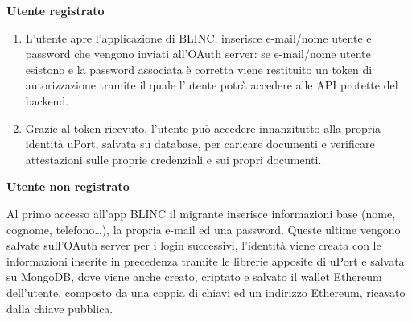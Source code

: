 \textbf{Utente registrato}

\begin{enumerate}
    \item L’utente apre l’applicazione di BLINC, inserisce e-mail/nome utente e password che vengono inviati all’OAuth server:
    se e-mail/nome utente esistono e la password associata è corretta viene restituito un token di autorizzazione tramite il quale l’utente potrà accedere alle API protette del backend.
    \item Grazie al token ricevuto, l’utente può accedere innanzitutto alla propria identità uPort, salvata su database, 
    per caricare documenti e verificare attestazioni sulle proprie credenziali e sui propri documenti.
\end{enumerate}

\textbf{Utente non registrato}
 
Al primo accesso all’app BLINC il migrante inserisce informazioni base (nome, cognome, telefono…),
la propria e-mail ed una password. Queste ultime vengono salvate sull’OAuth server per i login successivi, 
l’identità viene creata con le informazioni inserite in precedenza tramite le librerie apposite di uPort 
e salvata su MongoDB, dove viene anche creato, criptato e salvato il wallet Ethereum dell’utente,
composto da una coppia di chiavi ed un indirizzo Ethereum, ricavato dalla chiave pubblica.
